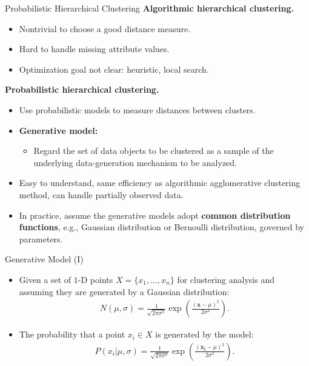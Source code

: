 \begin{frame}{Probabilistic Hierarchical Clustering}
	\textbf{Algorithmic hierarchical clustering.}
	\begin{itemize}
		\item Nontrivial to choose a good distance measure.
		\item Hard to handle missing attribute values.
		\item Optimization goal not clear: heuristic, local search.
	\end{itemize}
	\textbf{Probabilistic hierarchical clustering.}
	\begin{itemize}
		\item Use probabilistic models to measure distances between
		      clusters.
		\item \textbf{\color{airforceblue}Generative model:}
		      \begin{itemize}
			      \item Regard the set of data objects to be clustered as a
			            sample of the underlying data-generation mechanism to be
			            analyzed.
		      \end{itemize}
		\item Easy to understand, same efficiency as algorithmic
		      agglomerative clustering method, can handle partially observed data.
		\item In practice, assume the generative models adopt
		      \textbf{\color{airforceblue}common distribution functions}, e.g.,
		      Gaussian distribution or Bernoulli distribution, governed by
		      parameters.
	\end{itemize}
\end{frame}

\begin{frame}{Generative Model (I)}
	\centering
	\begin{itemize}
		\item Given a set of $1$-D points $X = \{x_1, \ldots, x_n\}$ for
		      clustering analysis and assuming they are generated by a Gaussian
		      distribution:
		      \begin{align*}
			      N(\mu,\sigma) = \frac{1}{\sqrt{2 \pi \sigma^2}}
			      \exp\left({\frac{(\mathbf{x}-\mu)^2}{2\sigma^2}}\right).
		      \end{align*}
		\item The probability that a point $x_i \in X$ is generated by the
		      model:
		      \begin{align*}
			      P(x_i \vert \mu, \sigma) = \frac{1}{\sqrt{2\pi\sigma^2}} \exp\left(
			      \frac{(\mathbf{x_i}-\mu)^2}{2\sigma^2}\right).
		      \end{align*}
	\end{itemize}
\end{frame}

